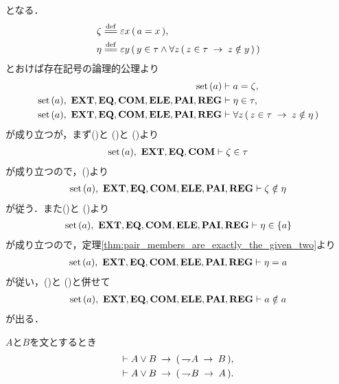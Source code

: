 \begin{sketch}
		となる．
		\begin{align}
			\zeta &\defeq \varepsilon x\, (\, a = x\, ), \\
			\eta &\defeq \varepsilon y\, (\, y \in \tau \wedge \forall z\, (\, 
			z \in \tau \rarrow z \notin y\, )\, )
		\end{align}
		とおけば存在記号の論理的公理より
		\begin{align}
			\set{a} &\vdash a = \zeta, \label{fom:no_class_contains_itself_4} \\
			\set{a},\ \EXTAX,\EQAX,\COMAX,\ELEAX,\PAIAX,\REGAX &\vdash 
			\eta \in \tau, \label{fom:no_class_contains_itself_5} \\
			\set{a},\ \EXTAX,\EQAX,\COMAX,\ELEAX,\PAIAX,\REGAX &\vdash 
			\forall z\, (\, z \in \tau \rarrow z \notin \eta\, )
			\label{fom:no_class_contains_itself_6}
		\end{align}
		が成り立つが，まず()と
		()と
		()より
		\begin{align}
			\operatorname*{set}\hspace{0.15em}(a),\ \mbox{{\bf EXT}},\mbox{{\bf EQ}},\mbox{\bf COM} \vdash \zeta \in \tau
		\end{align}
		が成り立つので，()より
		\begin{align}
			\set{a},\ \EXTAX,\EQAX,\COMAX,\ELEAX,\PAIAX,\REGAX \vdash 
			\zeta \notin \eta
			\label{fom:no_class_contains_itself_7}
		\end{align}
		が従う．また()と
		()より
		\begin{align}
			\operatorname*{set}\hspace{0.15em}(a),\ \mbox{{\bf EXT}},\mbox{{\bf EQ}},\mbox{\bf COM},\mbox{{\bf ELE}},\mbox{{\bf PAI}},\mbox{{\bf REG}} \vdash \eta \in \{a\}
		\end{align}
		が成り立つので，定理\ref{thm:pair_members_are_exactly_the_given_two}より
		\begin{align}
			\operatorname*{set}\hspace{0.15em}(a),\ \mbox{{\bf EXT}},\mbox{{\bf EQ}},\mbox{\bf COM},\mbox{{\bf ELE}},\mbox{{\bf PAI}},\mbox{{\bf REG}} \vdash \eta = a
		\end{align}
		が従い，()と
		()と併せて
		\begin{align}
			\operatorname*{set}\hspace{0.15em}(a),\ \mbox{{\bf EXT}},\mbox{{\bf EQ}},\mbox{\bf COM},\mbox{{\bf ELE}},\mbox{{\bf PAI}},\mbox{{\bf REG}} \vdash a \notin a
		\end{align}
		が出る．
		\QED
	\end{sketch}
	
	\begin{screen}
		\begin{logicalthm}[選言三段論法]
		\label{logicalthm:disjunctive_syllogism}
			$A$と$B$を文とするとき
			\begin{align}
				\vdash A \vee B \hspace{0.25em}\rightarrow\hspace{0.25em} (\, \rightharpoondown\hspace{-0.25em} A \hspace{0.25em}\rightarrow\hspace{0.25em} B\, ), \\
				\vdash A \vee B \hspace{0.25em}\rightarrow\hspace{0.25em} (\, \rightharpoondown\hspace{-0.25em} B \hspace{0.25em}\rightarrow\hspace{0.25em} A\, ).
			\end{align}
		\end{logicalthm}
	\end{screen}
	
